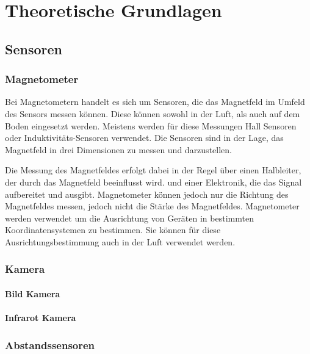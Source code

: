 \chapter{Theoretische Grundlagen}


\section{Sensoren}

    \subsection{Magnetometer}

    Bei Magnetometern handelt es sich um Sensoren, die das Magnetfeld im Umfeld des Sensors messen können.
    Diese können sowohl in der Luft, als auch auf dem Boden eingesetzt werden.
    Meistens werden für diese Messungen Hall Sensoren oder Induktivitäts-Sensoren verwendet.
    Die Sensoren sind in der Lage, das Magnetfeld in drei Dimensionen zu messen und darzustellen.

    Die Messung des Magnetfeldes erfolgt dabei in der Regel über einen Halbleiter, der durch das Magnetfeld beeinflusst wird.
    und einer Elektronik, die das Signal aufbereitet und ausgibt.
    Magnetometer können jedoch nur die Richtung des Magnetfeldes messen, jedoch nicht die Stärke des Magnetfeldes.
    Magnetometer werden verwendet um die Ausrichtung von Geräten in bestimmten Koordinatensystemen zu bestimmen.
    Sie können für diese Ausrichtungsbestimmung auch in der Luft verwendet werden. 

    \subsection{Kamera} \label{kamera:section}

        \subsubsection{Bild Kamera} \label{bild_kamera:subsubsection}

        \subsubsection{Infrarot Kamera} \label{infrarot_kamera:subsubsection}

    \subsection{Abstandssensoren} \label{abstandssensoren:subsection}

